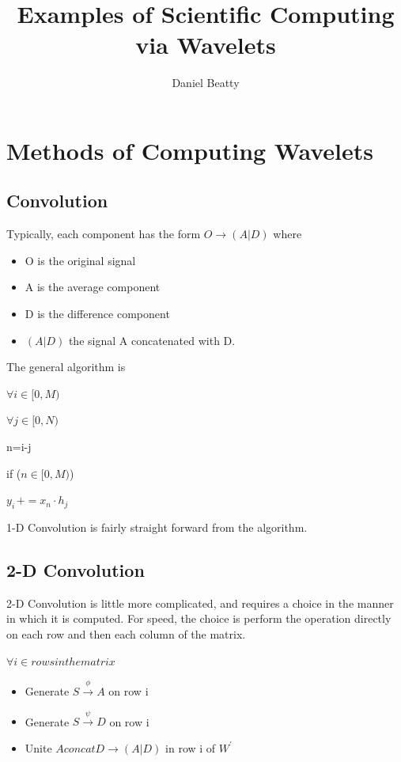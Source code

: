 \documentclass[11pt]{article}
\title{Examples of Scientific Computing via Wavelets}
\author{Daniel Beatty}
\begin{document}
\maketitle

\newpage
\section {Methods of Computing Wavelets}
\subsection{Convolution}
Typically, each component has the form $O\rightarrow (A|D)$ where 
\begin{itemize}
\item  O is the original signal
\item A is the average component
\item D is the difference component 
\item $(A|D)$ the signal A concatenated with D. 
\end{itemize}

The general algorithm is 

$\forall i\in \lbrack 0,M)$

\qquad $\forall j\in \lbrack 0,N)$

\qquad \qquad n=i-j

\qquad \qquad if ($n\in \lbrack 0,M)$)

\qquad \qquad \qquad $y_{i\,}+=x_{n}\cdot h_{j\,}$

1-D Convolution is fairly straight forward from the algorithm.  

 
\subsection{2-D Convolution}
2-D Convolution is little more complicated, and requires a choice in the manner in which it is computed.  For speed, the choice is perform the operation directly on each row and then each column of the matrix.  

$\forall i  \in rows in the matrix$
\begin{itemize}
\item Generate $S \stackrel{\phi}{\to} A$ on row i
\item Generate $S \stackrel{\psi}{\to} D$ on row i
\item Unite $A concat D \to (A|D) $ in row i of $W^\prime $
\end{itemize}
\end{document}
